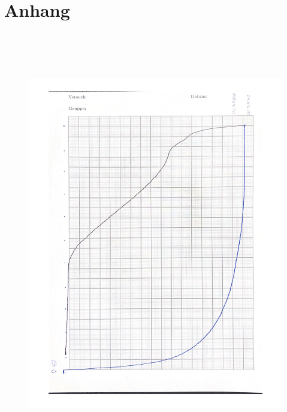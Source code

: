 \section{Anhang} \label{sec:Anh1}

\begin{figure}[H]
    \centering
    \includegraphics[height=185mm]{bilder/Anh1.pdf}
    \caption{\label{Abbildung6} }
\end{figure}


